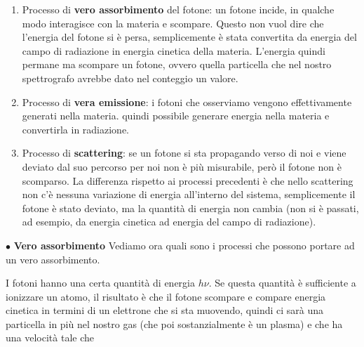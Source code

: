 \begin{enumerate}
    \item Processo di \textbf{vero assorbimento} del fotone: un fotone incide, in qualche modo interagisce con la materia e scompare. Questo non vuol dire che l'energia del fotone si è persa, semplicemente è stata convertita da energia del campo di radiazione in energia cinetica della materia. L'energia quindi permane ma scompare un fotone, ovvero quella particella che nel nostro spettrografo avrebbe dato nel conteggio un valore.
    \item Processo di \textbf{vera emissione}: i fotoni che osserviamo vengono effettivamente generati nella materia. \E quindi possibile generare energia nella materia e convertirla in radiazione.
    \item Processo di \textbf{scattering}: se un fotone si sta propagando verso di noi e viene deviato dal suo percorso per noi non è più misurabile, però il fotone non è scomparso. La differenza rispetto ai processi precedenti è che nello scattering non c'è nessuna variazione di energia all'interno del sistema, semplicemente il fotone è stato deviato, ma la quantità di energia non cambia (non si è passati, ad esempio, da energia cinetica ad energia del campo di radiazione).
\end{enumerate}


$\bullet$ \textbf{Vero assorbimento}
Vediamo ora quali sono i processi che possono portare ad un vero assorbimento.

I fotoni hanno una certa quantità di energia $h\nu$. Se questa quantità è sufficiente a ionizzare un atomo, il risultato è che il fotone scompare e compare energia cinetica in termini di un elettrone che si sta muovendo, quindi ci sarà una particella in più nel nostro gas (che poi sostanzialmente è un plasma) e che ha una velocità tale che


